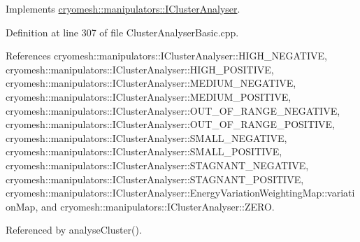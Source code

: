 \-Implements \hyperlink{classcryomesh_1_1manipulators_1_1IClusterAnalyser_a27db139b4aa43f0c008de165d2f22f5b}{cryomesh\-::manipulators\-::\-I\-Cluster\-Analyser}.



\-Definition at line 307 of file \-Cluster\-Analyser\-Basic.\-cpp.



\-References cryomesh\-::manipulators\-::\-I\-Cluster\-Analyser\-::\-H\-I\-G\-H\-\_\-\-N\-E\-G\-A\-T\-I\-V\-E, cryomesh\-::manipulators\-::\-I\-Cluster\-Analyser\-::\-H\-I\-G\-H\-\_\-\-P\-O\-S\-I\-T\-I\-V\-E, cryomesh\-::manipulators\-::\-I\-Cluster\-Analyser\-::\-M\-E\-D\-I\-U\-M\-\_\-\-N\-E\-G\-A\-T\-I\-V\-E, cryomesh\-::manipulators\-::\-I\-Cluster\-Analyser\-::\-M\-E\-D\-I\-U\-M\-\_\-\-P\-O\-S\-I\-T\-I\-V\-E, cryomesh\-::manipulators\-::\-I\-Cluster\-Analyser\-::\-O\-U\-T\-\_\-\-O\-F\-\_\-\-R\-A\-N\-G\-E\-\_\-\-N\-E\-G\-A\-T\-I\-V\-E, cryomesh\-::manipulators\-::\-I\-Cluster\-Analyser\-::\-O\-U\-T\-\_\-\-O\-F\-\_\-\-R\-A\-N\-G\-E\-\_\-\-P\-O\-S\-I\-T\-I\-V\-E, cryomesh\-::manipulators\-::\-I\-Cluster\-Analyser\-::\-S\-M\-A\-L\-L\-\_\-\-N\-E\-G\-A\-T\-I\-V\-E, cryomesh\-::manipulators\-::\-I\-Cluster\-Analyser\-::\-S\-M\-A\-L\-L\-\_\-\-P\-O\-S\-I\-T\-I\-V\-E, cryomesh\-::manipulators\-::\-I\-Cluster\-Analyser\-::\-S\-T\-A\-G\-N\-A\-N\-T\-\_\-\-N\-E\-G\-A\-T\-I\-V\-E, cryomesh\-::manipulators\-::\-I\-Cluster\-Analyser\-::\-S\-T\-A\-G\-N\-A\-N\-T\-\_\-\-P\-O\-S\-I\-T\-I\-V\-E, cryomesh\-::manipulators\-::\-I\-Cluster\-Analyser\-::\-Energy\-Variation\-Weighting\-Map\-::variation\-Map, and cryomesh\-::manipulators\-::\-I\-Cluster\-Analyser\-::\-Z\-E\-R\-O.



\-Referenced by analyse\-Cluster().

